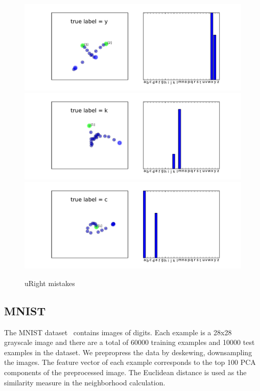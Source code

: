 \documentclass{article}
\begin{document}
\begin{figure}[ht]
\vskip 0.2in
\begin{center}
\centering
  \includegraphics[width=.95\linewidth]{figures/icml-uright-interesting-134.pdf}\\
  \includegraphics[width=.95\linewidth]{figures/icml-uright-interesting-70.pdf}\\
  \includegraphics[width=.95\linewidth]{figures/icml-uright-interesting-248.pdf}\\
  \caption{uRight mistakes}
  \label{fig:uright-mistakes}
\end{center}
\vskip -0.2in
\end{figure}

\subsection{MNIST}
The MNIST dataset~\cite{Lecun1998} contains images of digits. Each
example is a 28x28 grayscale image and there are a total of 60000
training examples and 10000 test examples in the dataset. We
prepropress the data by deskewing, downsampling the images. The
feature vector of each example corresponds to the top 100 PCA
components of the preprocessed image. The Euclidean distance is used
as the similarity measure in the neighborhood calculation.
\end{document}
